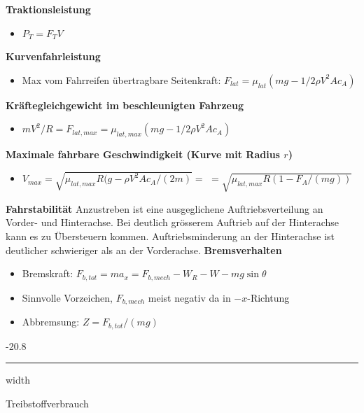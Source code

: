 \documentclass[8pt, landscape, fleqn]{scrartcl}
\makeatletter
\renewcommand{\subsubsection}{\@startsection{subsubsection}{1}{0mm}%
{-2\baselineskip}{0.8\baselineskip}%
{\hrule depth 0.2pt width\columnwidth\vspace*{1.2em}\normalsize\bfseries\rmfamily}}
\makeatother
\begin{document}
\begin{multicols*}{3}
\textbf{Traktionsleistung}

\begin{itemize}
    \item $P_T = F_T V$
\end{itemize}

\textbf{Kurvenfahrleistung}

\begin{itemize}
    \item Max vom Fahrreifen übertragbare Seitenkraft: \newline $F_{lat} = \mu_{lat}(mg - 1/2 \rho V^2A c_A)$
\end{itemize}

\textbf{Kräftegleichgewicht im beschleunigten Fahrzeug}

\begin{itemize}
    \item $mV^2 / R = F_{lat,max} = \mu_{lat,max}(mg- 1/2 \rho V^2 A c_A)$
\end{itemize}

\textbf{Maximale fahrbare Geschwindigkeit (Kurve mit Radius $r$)}

\begin{itemize}
    \item $V_{max} = \sqrt{\mu_{lat,max} R(g-\rho V^2Ac_A/(2m)} =$ \newline $= \sqrt{\mu_{lat,max} R(1-F_A/(mg))}$
\end{itemize}

\textbf{Fahrstabilität}
\newline \newline
Anzustreben ist eine ausgeglichene Auftriebsverteilung an Vorder- und Hinterachse. Bei deutlich grösserem Auftrieb auf der Hinterachse
kann es zu Übersteuern kommen. Auftriebsminderung an der Hinterachse ist deutlicher schwieriger als an der Vorderachse.
\newline \newline
\textbf{Bremsverhalten}

\begin{itemize}
    \item Bremskraft: \newline $F_{b,tot} = ma_x = F_{b,mech} - W_R - W - mg \sin{\theta}$
    \item Sinnvolle Vorzeichen, $F_{b,mech}$ meist negativ da in $-x$-Richtung
    \item Abbremsung: $Z = F_{b,tot} / (mg)$
\end{itemize}

\subsubsection{Treibstoffverbrauch}


\end{multicols*}
\end{document}
